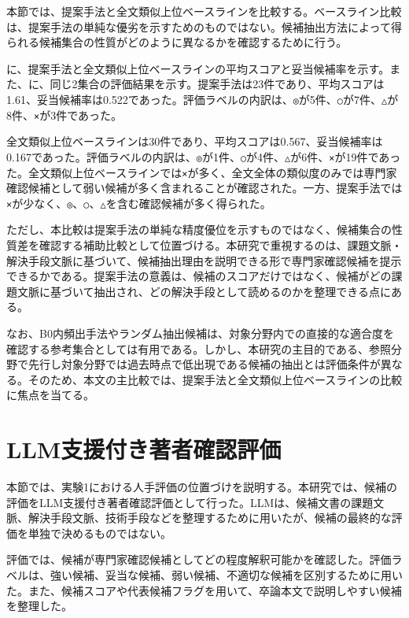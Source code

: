 



本節では、提案手法と全文類似上位ベースラインを比較する。ベースライン比較は、提案手法の単純な優劣を示すためのものではない。候補抽出方法によって得られる候補集合の性質がどのように異なるかを確認するために行う。

に、提案手法と全文類似上位ベースラインの平均スコアと妥当候補率を示す。また、に、同じ2集合の評価結果を示す。提案手法は23件であり、平均スコアは1.61、妥当候補率は0.522であった。評価ラベルの内訳は、\texttt{◎}が5件、\texttt{○}が7件、\texttt{△}が8件、\texttt{×}が3件であった。

全文類似上位ベースラインは30件であり、平均スコアは0.567、妥当候補率は0.167であった。評価ラベルの内訳は、\texttt{◎}が1件、\texttt{○}が4件、\texttt{△}が6件、\texttt{×}が19件であった。全文類似上位ベースラインでは\texttt{×}が多く、全文全体の類似度のみでは専門家確認候補として弱い候補が多く含まれることが確認された。一方、提案手法では\texttt{×}が少なく、\texttt{◎}、\texttt{○}、\texttt{△}を含む確認候補が多く得られた。

ただし、本比較は提案手法の単純な精度優位を示すものではなく、候補集合の性質差を確認する補助比較として位置づける。本研究で重視するのは、課題文脈・解決手段文脈に基づいて、候補抽出理由を説明できる形で専門家確認候補を提示できるかである。提案手法の意義は、候補のスコアだけではなく、候補がどの課題文脈に基づいて抽出され、どの解決手段として読めるのかを整理できる点にある。

なお、B0内頻出手法やランダム抽出候補は、対象分野内での直接的な適合度を確認する参考集合としては有用である。しかし、本研究の主目的である、参照分野で先行し対象分野では過去時点で低出現である候補の抽出とは評価条件が異なる。そのため、本文の主比較では、提案手法と全文類似上位ベースラインの比較に焦点を当てる。

\section{LLM支援付き著者確認評価}

本節では、実験1における人手評価の位置づけを説明する。本研究では、候補の評価をLLM支援付き著者確認評価として行った。LLMは、候補文書の課題文脈、解決手段文脈、技術手段などを整理するために用いたが、候補の最終的な評価を単独で決めるものではない。

評価では、候補が専門家確認候補としてどの程度解釈可能かを確認した。評価ラベルは、強い候補、妥当な候補、弱い候補、不適切な候補を区別するために用いた。また、候補スコアや代表候補フラグを用いて、卒論本文で説明しやすい候補を整理した。

